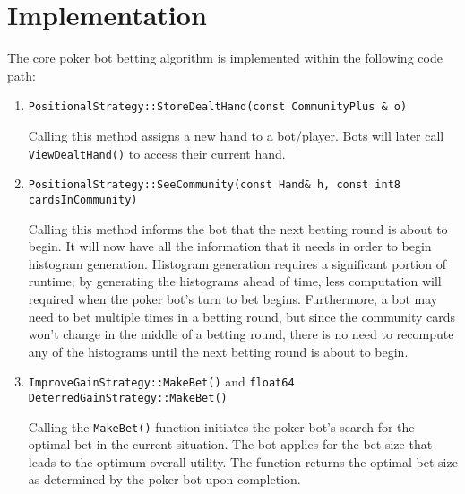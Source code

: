 \section{Implementation}
\label{sec:CompleteImplementation}


The core poker bot betting algorithm is implemented within the following code path:
\begin{enumerate}
\singlespacing
\item \texttt{PositionalStrategy::StoreDealtHand(const CommunityPlus \& o)}

Calling this method assigns a new hand to a bot/player.
Bots will later call \texttt{ViewDealtHand()} to access their current hand.

\item \texttt{PositionalStrategy::SeeCommunity(const Hand\& h, const int8 cardsInCommunity)}

Calling this method informs the bot that the next betting round is about to begin.
It will now have all the information that it needs in order to begin histogram generation.
Histogram generation requires a significant portion of runtime; by generating the histograms ahead of time, less computation will required when the poker bot's turn to bet begins.
Furthermore, a bot may need to bet multiple times in a betting round, but since the community cards won't change in the middle of a betting round, there is no need to recompute any of the histograms until the next betting round is about to begin.

\item \texttt{ImproveGainStrategy::MakeBet()} and \texttt{float64 DeterredGainStrategy::MakeBet()}

Calling the \texttt{MakeBet()} function initiates the poker bot's search for the optimal bet in the current situation.
The bot applies for the bet size that leads to the optimum overall utility.
The function returns the optimal bet size as determined by the poker bot upon completion.
\end{enumerate}

